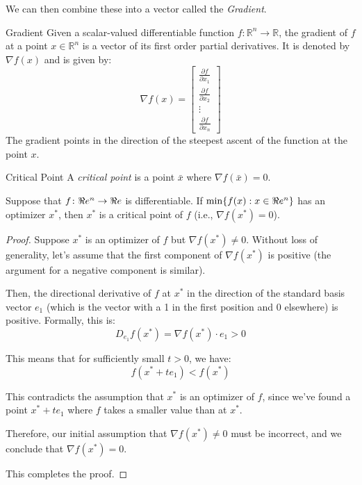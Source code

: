 We can then combine these into a vector called the \emph{Gradient}.

\begin{definition}{Gradient}{}
Given a scalar-valued differentiable function \( f: \mathbb{R}^n \rightarrow \mathbb{R} \), the gradient of \( f \) at a point \( x \in \mathbb{R}^n \) is a vector of its first order partial derivatives. It is denoted by \( \nabla f(x) \) and is given by:
\[
\nabla f(x) = \begin{bmatrix}
\frac{\partial f}{\partial x_1} \\
\frac{\partial f}{\partial x_2} \\
\vdots \\
\frac{\partial f}{\partial x_n}
\end{bmatrix}
\]
The gradient points in the direction of the steepest ascent of the function at the point \( x \).
\end{definition}


\begin{definition}{Critical Point}{}
A \emph{critical point} is a point $\bar x$ where $\nabla f(\bar x) = 0$.
\end{definition}

\begin{theorem}{}{}
Suppose that $f\colon \Re e^n \to \Re e$ is differentiable.  If $\min\{ f(x) : x \in \Re e^n\}$ has an optimizer $x^*$, then $x^*$ is a critical point of $f$ (i.e., $\nabla f(x^*) = 0$).
\end{theorem}
\begin{proof}
Suppose \( x^* \) is an optimizer of \( f \) but \( \nabla f(x^*) \neq 0 \). Without loss of generality, let's assume that the first component of \( \nabla f(x^*) \) is positive (the argument for a negative component is similar).

Then, the directional derivative of \( f \) at \( x^* \) in the direction of the standard basis vector \( e_1 \) (which is the vector with a 1 in the first position and 0 elsewhere) is positive. Formally, this is:
\[
D_{e_1} f(x^*) = \nabla f(x^*) \cdot e_1 > 0
\]

This means that for sufficiently small \( t > 0 \), we have:
\[
f(x^* + te_1) < f(x^*)
\]

This contradicts the assumption that \( x^* \) is an optimizer of \( f \), since we've found a point \( x^* + te_1 \) where \( f \) takes a smaller value than at \( x^* \).

Therefore, our initial assumption that \( \nabla f(x^*) \neq 0 \) must be incorrect, and we conclude that \( \nabla f(x^*) = 0 \).

This completes the proof.
\end{proof}


